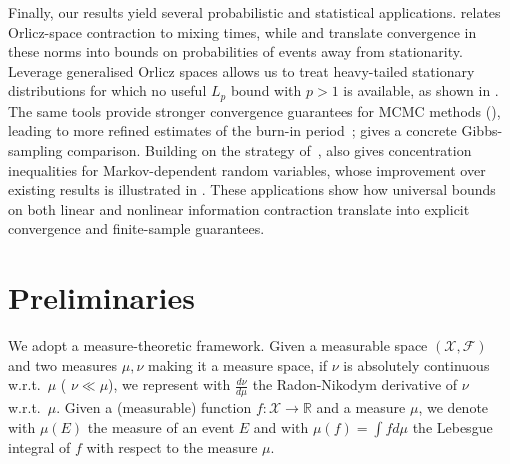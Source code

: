 \documentclass[11pt]{article}
\newcommand{\X}{\mathcal{X}}
\theoremstyle{plain}
\theoremstyle{remark}
\begin{document}
Finally, our results yield several probabilistic and statistical applications.  relates Orlicz-space contraction to mixing times, while  and  translate convergence in these norms into bounds on probabilities of events away from stationarity. Leverage generalised Orlicz spaces allows us to treat heavy-tailed stationary distributions for which no useful $L_p$ bound with $p>1$ is available, as shown in . The same tools provide stronger convergence guarantees for MCMC methods (), leading to more refined estimates of the burn-in period~\cite{mcmcThesis,dependentViaStatAndChange};  gives a concrete Gibbs-sampling comparison. Building on the strategy of~\cite{esposito2024concentration},  also gives concentration inequalities for Markov-dependent random variables, whose improvement over existing results is illustrated in . These applications show how universal bounds on both linear and nonlinear information contraction translate into explicit convergence and finite-sample guarantees.

 \section{Preliminaries}\label{sec:preliminaries}

	We %
 adopt a measure-theoretic framework.
	Given a measurable space $(\X,\mathcal{F})$ and two measures $\mu,\nu$ making it a measure space, if $\nu$ is absolutely continuous w.r.t.\ $\mu$ (%
 $\nu\ll\mu$), %
 we represent with $\frac{d\nu}{d\mu}$ the Radon-Nikodym derivative of $\nu$ w.r.t.\ $\mu$. Given a (measurable) function $f:\X \to \mathbb{R}$ and a measure $\mu$, we denote with $\mu(E)$ the measure of an event $E$ and with $\mu(f) = \int f d\mu$ the 
Lebesgue integral of $f$ with respect to the measure $\mu$. %
\end{document}
